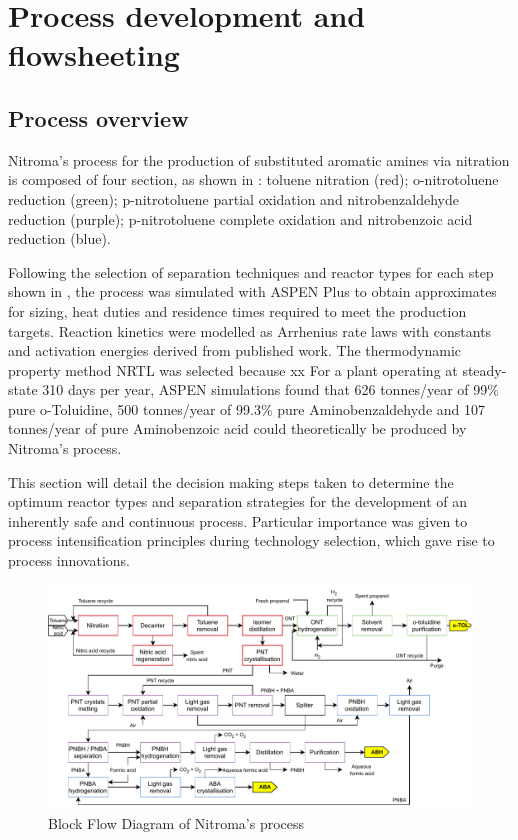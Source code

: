 \section{Process development and flowsheeting}

\subsection{Process overview}

Nitroma's process for the production of substituted aromatic amines via nitration is composed of four section, as shown in : toluene nitration (red); o-nitrotoluene reduction (green); p-nitrotoluene partial oxidation and nitrobenzaldehyde reduction (purple); p-nitrotoluene complete oxidation and nitrobenzoic acid reduction (blue). 




Following the selection of separation techniques and reactor types for each step shown in , the process was simulated with ASPEN Plus to obtain approximates for sizing, heat duties and residence times required to meet the production targets. Reaction kinetics were modelled as Arrhenius rate laws with constants and activation energies derived from published work. The thermodynamic property method NRTL was selected because xx
For a plant operating at steady-state 310 days per year, ASPEN simulations found that 626 tonnes/year of 99\% pure o-Toluidine, 500 tonnes/year of 99.3\% pure Aminobenzaldehyde and 107 tonnes/year of pure Aminobenzoic acid could theoretically be produced by Nitroma's process.

This section will detail the decision making steps taken to determine the optimum reactor types and separation strategies for the development of an inherently safe and continuous process. Particular importance was given to process intensification principles during technology selection, which gave rise to process innovations.

\begin{figure}[H]
    \centering
    \includegraphics[width=\linewidth]{1-Figures/BFD_nitroma.pdf}
    \caption{Block Flow Diagram of Nitroma's process}
    \label{fig:BFD}
\end{figure}


